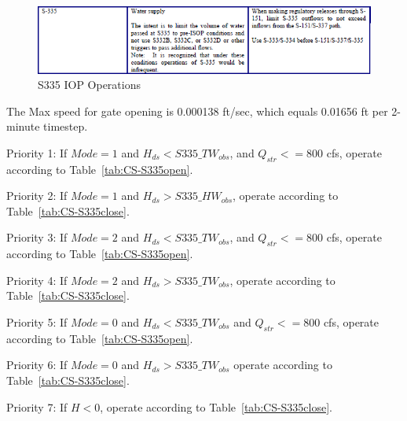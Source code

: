 \begin{figure}[!h]
  \begin{center}
  \includegraphics[width=6.5in]{../figs/S335_IOPops.png}
  \caption{S335 IOP Operations}
  \label{fig:S335iop}
  \end{center}
\end{figure}
%
%


The Max speed for gate opening is 0.000138 ft/sec, which equals 0.01656 ft per 2-minute timestep.

\begin{packed_items}
\item Priority 1: If $Mode=1$ and $H_{ds}<S335\_TW_{obs}$, and $Q_{str}<=800$ cfs, operate according to Table~\ref{tab:CS-S335open}.
\item Priority 2: If $Mode=1$ and \textcolor[rgb]{1.00,0.00,0.00}{$H_{ds}>S335\_HW_{obs}$},  operate according to Table~\ref{tab:CS-S335close}.
\item[]
\item Priority 3: If $Mode=2$ and $H_{ds}<S335\_TW_{obs}$, and $Q_{str}<=800$ cfs, operate according to Table~\ref{tab:CS-S335open}.
\item Priority 4: If $Mode=2$ and $H_{ds}>S335\_TW_{obs}$,  operate according to Table~\ref{tab:CS-S335close}.
\item[]
\item Priority 5: If $Mode=0$ and $H_{ds}<S335\_TW_{obs}$ and $Q_{str}<=800$ cfs,  operate according to Table~\ref{tab:CS-S335open}.
\item Priority 6: If $Mode=0$ and $H_{ds}>S335\_TW_{obs}$ operate according to Table~\ref{tab:CS-S335close}.
\item[]
\item Priority 7: If $H<0$, operate according to Table~\ref{tab:CS-S335close}.
\end{packed_items}

